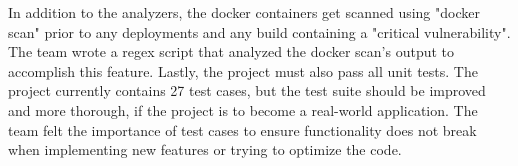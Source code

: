 In addition to the analyzers, the docker containers get scanned using "docker scan" prior to any deployments and any build containing a "critical vulnerability". The team wrote a regex script\cite{script} that analyzed the docker scan's output to accomplish this feature. Lastly, the project must also pass all unit tests. The project currently contains 27 test cases, but the test suite should be improved and more thorough, if the project is to become a real-world application. The team felt the importance of test cases to ensure functionality does not break when implementing new features or trying to optimize the code.

